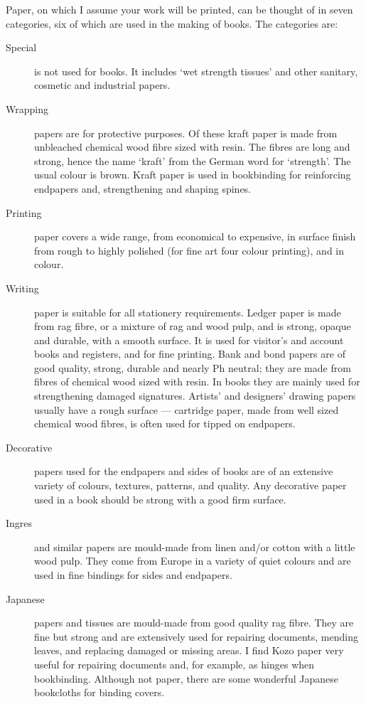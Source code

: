 \documentclass[10pt,a4paper,extrafontsizes]{memoir}
\begin{document}
\begin{paracol}{2}
\switchEng
    Paper, on which I assume your work will be printed, can be thought of
in seven categories, six of which are used in the making of books. The 
categories are: 
\begin{description}
\item[Special] is not used for books. 
It includes `wet strength tissues' and
other sanitary, cosmetic and industrial papers.
\item[Wrapping] papers are for protective purposes. 
Of these kraft paper is made from
unbleached chemical wood fibre sized with resin. The fibres are long and 
strong, hence the name `kraft' from the German word for `strength'. The usual
colour is brown. Kraft paper is used in bookbinding for reinforcing endpapers
and, strengthening and shaping spines.
\item[Printing] paper covers a wide range, 
from economical to expensive,
in surface finish from rough to highly polished (for fine art four colour
printing), and in colour.
\item[Writing] paper is suitable for all stationery 
requirements. Ledger
paper is made from rag fibre, or a mixture of rag and wood pulp, 
and is strong, opaque and durable, with a smooth
surface. It is used for visitor's and account books and registers, and for
fine printing. Bank and bond papers are of good quality, strong, durable 
and nearly Ph neutral; they are made from fibres of chemical wood
sized with resin. In books they are mainly used for strengthening damaged
signatures. Artists' and designers' drawing papers usually have a rough 
surface --- cartridge paper, made from well sized chemical wood fibres, 
is often used for tipped on endpapers.
\item[Decorative] papers used for the endpapers 
and sides of books are 
of an extensive variety of colours, textures, patterns, and quality. Any
decorative paper used in a book should be strong with a good firm surface.
\item[Ingres] and similar papers are mould-made 
from linen and/or cotton 
with a little
wood pulp. They come from Europe in a variety of quiet colours and are 
used in fine bindings for sides and endpapers.
\item[Japanese] papers and tissues are mould-made 
from good quality rag fibre.
They are fine but strong and are extensively used for repairing documents,
mending leaves, and replacing damaged or missing areas. I find 
Kozo paper very useful for repairing documents and, for 
example, as hinges when bookbinding. Although not paper, there are some 
wonderful Japanese bookcloths for binding covers.
\end{description}
\end{paracol}
\end{document}
